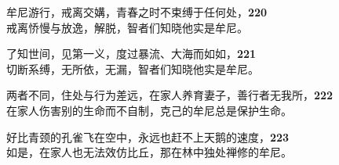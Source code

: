 牟尼游行，戒离交媾，青春之时不束缚于任何处，\hfill{\grayfootnotesize \textbf{220}} \\
戒离㤭慢与放逸，解脱，智者们知晓他实是牟尼。


了知世间，见第一义，度过暴流、大海而如如，\hfill{\grayfootnotesize \textbf{221}} \\
切断系缚，无所依，无漏，智者们知晓他实是牟尼。


两者不同，住处与行为差远，在家人养育妻子，善行者无我所，\hfill{\grayfootnotesize \textbf{222}} \\
在家人伤害别的生命而不自制，克己的牟尼总是保护生命。


好比青颈的孔雀飞在空中，永远也赶不上天鹅的速度，\hfill{\grayfootnotesize \textbf{223}} \\
如是，在家人也无法效仿比丘，那在林中独处禅修的牟尼。
